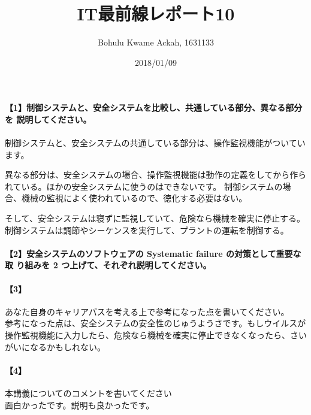 \documentclass[20 pts]{article}
\title{IT最前線レポート10}
\author{Bohulu Kwame Ackah, 1631133}
\date{2018/01/09}
\begin{document}
\maketitle

\newpage
\paragraph{【1】制御システムと、安全システムを比較し、共通している部分、異なる部分を
説明してください。 }
\paragraph{}
制御システムと、安全システムの共通している部分は、操作監視機能がついています。

異なる部分は、安全システムの場合、操作監視機能は動作の定義をしてから作られている。ほかの安全システムに使うのはできないです。
制御システムの場合、機械の監視によく使われているので、徳化する必要はない。

そして、安全システムは寝ずに監視していて、危険なら機械を確実に停止する。制御システムは調節やシーケンスを実行して、プラントの運転を制御する。

\paragraph{【2】安全システムのソフトウェアの Systematic failure の対策として重要な取
り組みを 2 つ上げて、それぞれ説明してください。 }
\paragraph{}




\newpage
\paragraph{【3】}あなた自身のキャリアパスを考える上で参考になった点を書いてください。\\
参考になった点は、安全システムの安全性のじゅうようさです。もしウイルスが操作監視機能に入力したら、危険なら機械を確実に停止できなくなったら、さいがいになるかもしれない。



\paragraph{【4】}本講義についてのコメントを書いてください\\
面白かったです。説明も良かったです。
\end{document}
